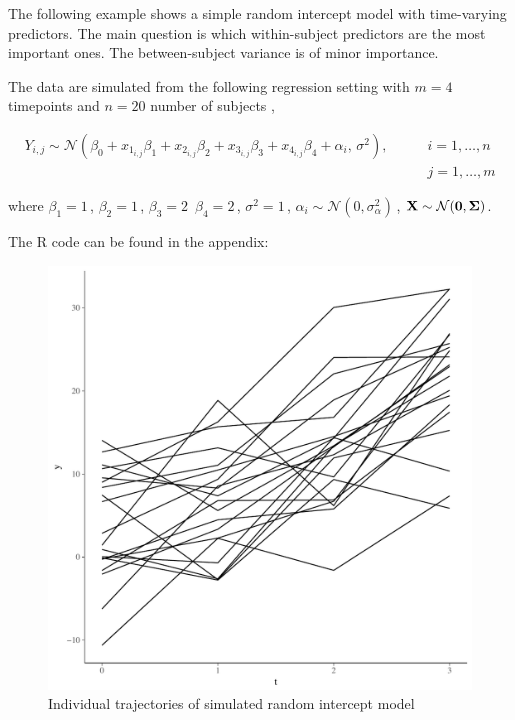 \documentclass[11pt,a4paper,twoside]{book}\usepackage[]{graphicx}\usepackage[]{color}
\makeatletter
\def\maxwidth{ %
  \ifdim\Gin@nat@width>\linewidth
    \linewidth
  \else
    \Gin@nat@width
  \fi
}
\newenvironment{knitrout}{}{} %
\makeatother
\begin{document}
The following example shows a simple random intercept model with time-varying predictors. The main question is which within-subject predictors are the most important ones. The between-subject variance is of minor importance. 

The data are simulated from the following regression setting with $m = 4$ timepoints and $n = 20$ number of subjects ,

\begin{align*} 
Y_{i,j} \sim \mathcal{N}(\beta_{0}+x_{1_{i,j}} \beta_{1}+x_{2_{i,j}} \beta_{2}+x_{3_{i,j}} \beta_{3}+x_{4_{i,j}} \beta_{4} + \alpha_{i}, \, \sigma^2), \qquad &i = 1, \dots, n \\  &j = 1, \dots, m
\end{align*} 

where $\beta_{1} = 1 \,$,  $\beta_{2} = 1 \,$,   $\beta_{3} = 2 \,$  $\beta_{4}=2 \,$, $\sigma^2 = 1 \, $, $\alpha_{i} \sim \mathcal{N}(0, \sigma_{\alpha}^2) \,$, ${\mathbf{X}} \sim \mathcal{N}({\mathbf{0}}, {\boldsymbol{\Sigma}}{})$.

The R code can be found in the appendix:



\begin{knitrout}
\color{fgcolor}\begin{figure}
\includegraphics[width=\maxwidth]{figure/ch04_fig_repeated_plot_ri-1} \caption[Individual trajectories of simulated random intercept model]{Individual trajectories of simulated random intercept model}\label{fig:.repeated.plot.ri}
\end{figure}


\end{knitrout}
\end{document}
